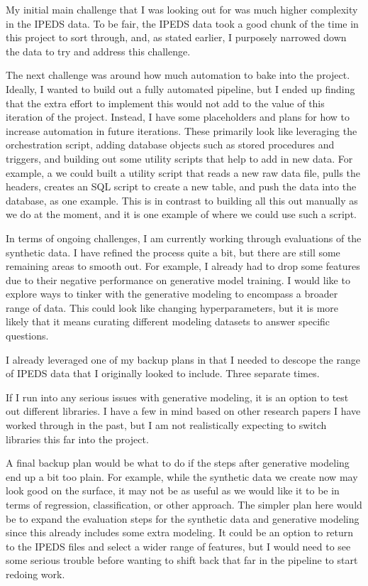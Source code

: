 \documentclass[sigconf, authorversion, nonacm]{acmart}
\begin{document}
    My initial main challenge that I was looking out for was much higher complexity in the IPEDS data. To be fair, the IPEDS data took a good chunk of the time in this project to sort through, and, as stated earlier, I purposely narrowed down the data to try and address this challenge.

    The next challenge was around how much automation to bake into the project. Ideally, I wanted to build out a fully automated pipeline, but I ended up finding that the extra effort to implement this would not add to the value of this iteration of the project. Instead, I have some placeholders and plans for how to increase automation in future iterations. These primarily look like leveraging the orchestration script, adding database objects such as stored procedures and triggers, and building out some utility scripts that help to add in new data. For example, a we could built a utility script that reads a new raw data file, pulls the headers, creates an SQL script to create a new table, and push the data into the database, as one example. This is in contrast to building all this out manually as we do at the moment, and it is one example of where we could use such a script.

    In terms of ongoing challenges, I am currently working through evaluations of the synthetic data. I have refined the process quite a bit, but there are still some remaining areas to smooth out. For example, I already had to drop some features due to their negative performance on generative model training. I would like to explore ways to tinker with the generative modeling to encompass a broader range of data. This could look like changing hyperparameters, but it is more likely that it means curating different modeling datasets to answer specific questions.

    I already leveraged one of my backup plans in that I needed to descope the range of IPEDS data that I originally looked to include. Three separate times.

    If I run into any serious issues with generative modeling, it is an option to test out different libraries. I have a few in mind based on other research papers I have worked through in the past, but I am not realistically expecting to switch libraries this far into the project.

    A final backup plan would be what to do if the steps after generative modeling end up a bit too plain. For example, while the synthetic data we create now may look good on the surface, it may not be as useful as we would like it to be in terms of regression, classification, or other approach. The simpler plan here would be to expand the evaluation steps for the synthetic data and generative modeling since this already includes some extra modeling. It could be an option to return to the IPEDS files and select a wider range of features, but I would need to see some serious trouble before wanting to shift back that far in the pipeline to start redoing work.
\end{document}
